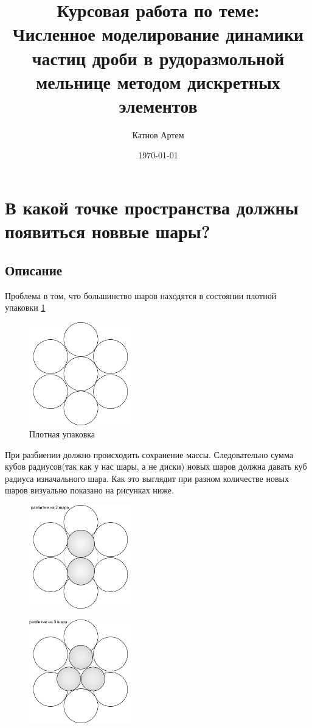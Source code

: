 \documentclass[a4paper]{article}
\author{Катнов Артем}
\title{Курсовая работа по теме: \\ Численное моделирование динамики частиц дроби в рудоразмольной мельнице методом дискретных элементов}
\date{\today}
\begin{document}
\selectfont
\newpage

\section{В какой точке пространства должны появиться новвые шары?}

\subsection{Описание}
Проблема в том, что большинство шаров находятся в состоянии плотной упаковки \ref{pic:upak}
\begin{figure}[h!]
	\centering
	\includegraphics[width=0.4\textwidth]{Component1}
	\caption{Плотная упаковка}
	\label{pic:upak}
\end{figure} 

При разбиении должно происходить сохранение массы. 
Следовательно сумма кубов радиусов(так как у нас шары, а не диски) новых шаров должна давать куб радиуса изначального шара.
Как это выглядит при разном количестве новых шаров визуально показано на рисунках ниже.

\begin{figure}[h!]
	\centering
	\includegraphics[width=0.4\textwidth]{Component2}
	\label{pic:2balls}
	\caption{}
\end{figure} 

\begin{figure}[h!]
	\centering
	\includegraphics[width=0.4\textwidth]{Component3}
	\label{pic:3balls}
	\caption{}
\end{figure} 
\end{document}
